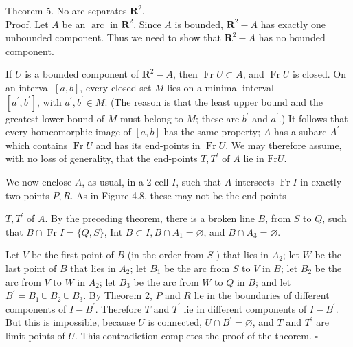 Theorem 5. No arc separates $\mathbf{R}^{2}$.\\
Proof. Let $A$ be an $\operatorname{arc}$ in $\mathbf{R}^{2}$. Since $A$ is bounded, $\mathbf{R}^{2}-A$ has exactly one unbounded component. Thus we need to show that $\mathbf{R}^{2}-A$ has no bounded component.

If $U$ is a bounded component of $\mathbf{R}^{2}-A$, then $\operatorname{Fr} U \subset A$, and $\operatorname{Fr} U$ is closed. On an interval $[a, b]$, every closed set $M$ lies on a minimal interval\\
$\left[a^{\prime}, b^{\prime}\right]$, with $a^{\prime}, b^{\prime} \in M$. (The reason is that the least upper bound and the greatest lower bound of $M$ must belong to $M$; these are $b^{\prime}$ and $a^{\prime}$.) It follows that every homeomorphic image of $[a, b]$ has the same property; $A$ has a subarc $A^{\prime}$ which contains $\operatorname{Fr} U$ and has its end-points in $\operatorname{Fr} U$. We may therefore assume, with no loss of generality, that the end-points $T, T^{\prime}$ of $A$ lie in $\mathrm{Fr} U$.

We now enclose $A$, as usual, in a 2-cell $\bar{I}$, such that $A$ intersects $\operatorname{Fr} I$ in exactly two points $P, R$. As in Figure 4.8, these may not be the end-points

\begin{center}
\end{center}


$T, T^{\prime}$ of $A$. By the preceding theorem, there is a broken line $B$, from $S$ to $Q$, such that $B \cap \operatorname{Fr} I=\{Q, S\}$, Int $B \subset I, B \cap A_{1}=\varnothing$, and $B \cap A_{3}=\varnothing$.

Let $V$ be the first point of $B$ (in the order from $S$ ) that lies in $A_{2}$; let $W$ be the last point of $B$ that lies in $A_{2}$; let $B_{1}$ be the arc from $S$ to $V$ in $B$; let $B_{2}$ be the arc from $V$ to $W$ in $A_{2}$; let $B_{3}$ be the arc from $W$ to $Q$ in $B$; and let $B^{\prime}=B_{1} \cup B_{2} \cup B_{3}$. By Theorem 2, $P$ and $R$ lie in the boundaries of different components of $I-B^{\prime}$. Therefore $T$ and $T^{\prime}$ lie in different components of $I-B^{\prime}$. But this is impossible, because $U$ is connected, $U \cap B^{\prime}=\varnothing$, and $T$ and $T^{\prime}$ are limit points of $U$. This contradiction completes the proof of the theorem. \(\square\)
